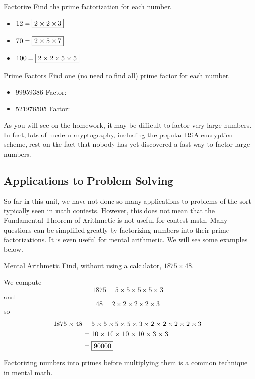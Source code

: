 \documentclass[a4paper,10pt]{report}
\begin{document}
\begin{problem}{Factorize}
 Find the prime factorization for each number.

 \begin{itemize}
  \item $12 = \Ans{2\times2\times3}$
  \item $70 = \Ans{2\times5\times7}$
  \item $100 = \Ans{2\times2\times5\times5}$
 \end{itemize}
\end{problem}

\begin{problem}{Prime Factors}
 Find one (no need to find all) prime factor for each number.

 \begin{itemize}
  \item $99959386$ \hfill Factor: 
  \item $521976505$ \hfill Factor: 
 \end{itemize}
\end{problem}

As you will see on the homework, it may be difficult to factor very large
numbers. In fact, lots of modern cryptography, including the popular RSA
encryption scheme, rest on the fact that nobody has yet discovered a fast way to
factor large numbers.

\subsection{Applications to Problem Solving}

So far in this unit, we have not done so many applications to problems of the
sort typically seen in math contests. However, this does not mean that the
Fundamental Theorem of Arithmetic is not useful for contest math. Many questions
can be simplified greatly by factorizing numbers into their prime
factorizations. It is even useful for mental arithmetic. We will see some
examples below.

\begin{problem}{Mental Arithmetic}
 Find, without using a calculator, $1875\times48$.

 \begin{solution}
  We compute \[
   1875 = 5 \times 5 \times 5 \times 5 \times 3
  \] and \[
   48 = 2 \times 2 \times 2 \times 2 \times 3
  \] so \begin{align*}
   1875 \times 48
   &= 5 \times 5 \times 5 \times 5 \times 3 \times 2 \times 2 \times 2 \times 2
   \times 3 \\
   &= 10 \times 10 \times 10 \times 10 \times 3 \times 3 \\
   &= \Ans{90000}
  \end{align*}

  Factorizing numbers into primes before multiplying them is a common technique
  in mental math.
 \end{solution}
\end{problem}
\end{document}
